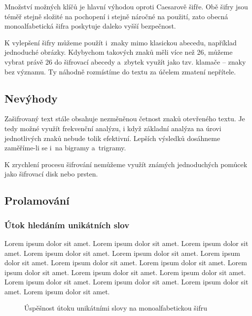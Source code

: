\documentclass[glossaries, index]{kidiplom}
\begin{document}
Množství možných klíčů je hlavní výhodou oproti Caesarově šifře. Obě šifry jsou téměř stejně složité na pochopení i stejně náročné na použití, zato obecná monoalfabetická šifra poskytuje daleko vyšší bezpečnost.

K vylepšení šifry můžeme použít i~znaky mimo klasickou abecedu, například jednoduché obrázky. Kdybychom takových znaků měli více než 26, můžeme vybrat právě 26 do šifrovací abecedy a~zbytek využít jako tzv. klamače -- znaky bez významu. Ty náhodně rozmístíme do textu za účelem zmatení nepřítele.

\subsection{Nevýhody}
Zašifrovaný text stále obsahuje nezměněnou četnost znaků otevřeného textu. Je tedy možné využít frekvenční analýzu, i když základní analýza na úrovi jednotlivých znaků nebude tolik efektivní. Lepších výsledků dosáhneme zaměříme-li se i~na bigramy a~trigramy.

K zrychlení procesu šifrování nemůžeme využít známých jednoduchých pomůcek jako šifrovací disk nebo prsten.

\subsection{Prolamování}
\subsubsection{Útok hledáním unikátních slov}
Lorem ipsum dolor sit amet. Lorem ipsum dolor sit amet. Lorem ipsum dolor sit amet. Lorem ipsum dolor sit amet. Lorem ipsum dolor sit amet. Lorem ipsum dolor sit amet. Lorem ipsum dolor sit amet. Lorem ipsum dolor sit amet. Lorem ipsum dolor sit amet. Lorem ipsum dolor sit amet. Lorem ipsum dolor sit amet. Lorem ipsum dolor sit amet. Lorem ipsum dolor sit amet. Lorem ipsum dolor sit amet. Lorem ipsum dolor sit amet. 

\begin{figure}[htbp]
\centering
{}
\caption{Úspěšnost útoku unikátními slovy na monoalfabetickou šifru}
\end{figure}
\end{document}
